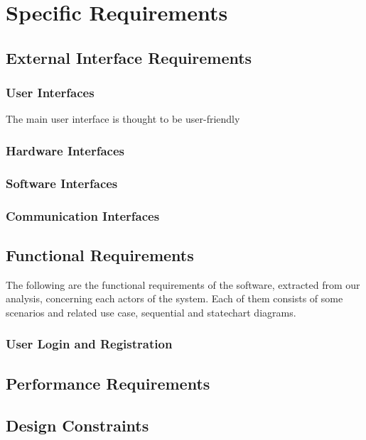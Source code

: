 \chapter{Specific Requirements}
\label{cha:requirements}

\section{External Interface Requirements}
\label{sec:ex_req}

\subsection{User Interfaces}
The main user interface is thought to be user-friendly 
\subsection{Hardware Interfaces}
\subsection{Software Interfaces}
\subsection{Communication Interfaces}

\section{Functional Requirements}
\label{sec:func_req}
The following are the functional requirements of the software, extracted from our analysis, concerning each actors of the system. Each of them consists of some scenarios and related use case, sequential and statechart diagrams.

\subsection*{User Login and Registration}


\section{Performance Requirements}
\label{sec:perf_req}

\section{Design Constraints}
\label{sec:design_constraints}

